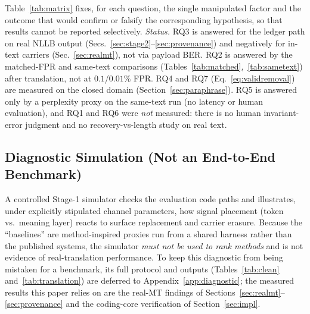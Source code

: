 \documentclass[journal]{IEEEtran}
\begin{document}
Table~\ref{tab:matrix} fixes, for each question, the single manipulated factor and the outcome that would confirm or falsify the corresponding hypothesis, so that results cannot be reported selectively. \emph{Status.} RQ3 is answered for the ledger path on real NLLB output (Secs.~\ref{sec:stage2}--\ref{sec:provenance}) and negatively for in-text carriers (Sec.~\ref{sec:realmt}), not via payload BER. RQ2 is answered by the matched-FPR and same-text comparisons (Tables~\ref{tab:matched},~\ref{tab:sametext}) after translation, not at $0.1$/$0.01\%$ FPR. RQ4 and RQ7 (Eq.~\ref{eq:validremoval}) are measured on the closed domain (Section~\ref{sec:paraphrase}). RQ5 is answered only by a perplexity proxy on the same-text run (no latency or human evaluation), and RQ1 and RQ6 were \emph{not} measured: there is no human invariant-error judgment and no recovery-vs-length study on real text.

\subsection{Diagnostic Simulation (Not an End-to-End Benchmark)}
A controlled Stage-1 simulator checks the evaluation code paths and
illustrates, under explicitly stipulated channel parameters, how signal
placement (token vs.\ meaning layer) reacts to surface replacement and
carrier erasure. Because the ``baselines'' are method-inspired proxies run
from a shared harness rather than the published systems, the simulator
\emph{must not be used to rank methods} and is not evidence of
real-translation performance. To keep this diagnostic from being mistaken
for a benchmark, its full protocol and outputs
(Tables~\ref{tab:clean} and~\ref{tab:translation}) are deferred to
Appendix~\ref{app:diagnostic}; the measured results this paper relies on are
the real-MT findings of Sections~\ref{sec:realmt}--\ref{sec:provenance} and
the coding-core verification of Section~\ref{sec:impl}.
\end{document}
